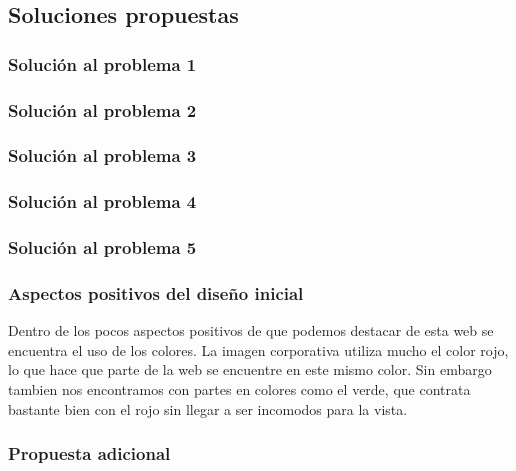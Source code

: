 \documentclass[a4paper,11pt]{article}
\begin{document}
\subsection{Soluciones propuestas}
\subsubsection{Solución al problema 1}
\subsubsection{Solución al problema 2}
\subsubsection{Solución al problema 3}
\subsubsection{Solución al problema 4}
\subsubsection{Solución al problema 5}


\subsubsection{Aspectos positivos del diseño inicial}
Dentro de los pocos aspectos positivos de que podemos destacar de esta web se encuentra el uso de los colores. La imagen corporativa utiliza mucho el color rojo, lo que hace que parte de la web se encuentre en este mismo color. Sin embargo tambien nos encontramos con partes en colores como el verde, que contrata bastante bien con el rojo sin llegar a ser incomodos para la vista.
\subsubsection{Propuesta adicional}
\end{document}
